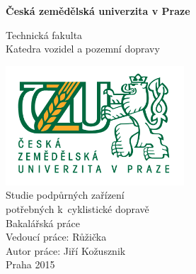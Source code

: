 \documentclass[a4paper,11pt]{article}
\begin{document}
\begin{titlepage}
    \begin{center}
        \vspace*{1cm}
        
        \textbf{Česká zemědělská univerzita v Praze}
        
        \vspace{0.5cm}
        Technická fakulta\\
        \vspace{0.5cm}
        Katedra vozidel a pozemní dopravy\\

        
        \vspace{0.8cm}
        
        \includegraphics[width=0.5\textwidth]{./logo}
        \vspace{0.8cm}\\
        Studie podpůrných zařízení\\
        potřebných k~cyklistické dopravě\\
        \vspace{0.5cm}
        Bakalářská práce\\
        
        \vfill              
	    Vedoucí práce: Růžička\\
        \vspace{0.5cm}
        Autor práce: Jiří Kožusznik\\ 
        \vspace{0.5cm}
        Praha 2015\\
        
    \end{center}
\end{titlepage}

\tableofcontents
\newpage
\end{document}
